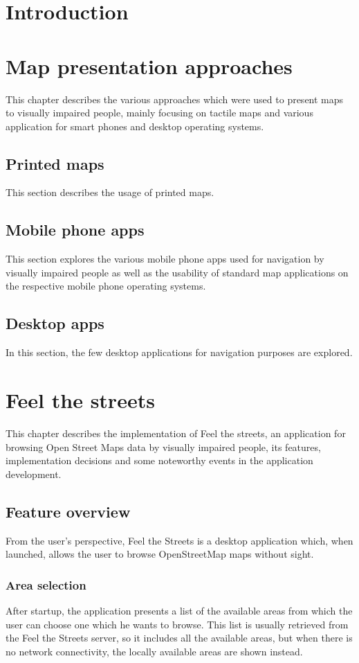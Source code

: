 \documentclass[nolof,digital]{fithesis3}
\begin{document}
\chapter{Introduction}
\chapter{Map presentation approaches}
This chapter describes the various approaches which were used to present maps to visually impaired people, mainly focusing on tactile maps and various application for smart phones and desktop operating systems.
\section{Printed maps}
This section describes the usage of printed maps.
\section{Mobile phone apps}
This section explores the various mobile phone apps used for navigation by visually impaired people as well as the usability of standard map applications on the respective mobile phone operating systems.
\section{Desktop apps}
In this section, the few desktop applications for navigation purposes are explored.
\chapter{Feel the streets}
This chapter describes the implementation of Feel the streets, an application for browsing Open Street Maps data by visually impaired people, its features, implementation decisions and some noteworthy events in the application development.
\section{Feature overview}
From the user's perspective, Feel the Streets is a desktop application which, when launched, allows the user to browse OpenStreetMap maps without sight.
\subsection{Area selection}
After startup, the application presents a list of the available areas from which the user can choose one which he wants to browse. This list is usually retrieved from the Feel the Streets server, so it includes all the available areas, but when there is no network connectivity, the locally available areas are shown instead.
\end{document}
